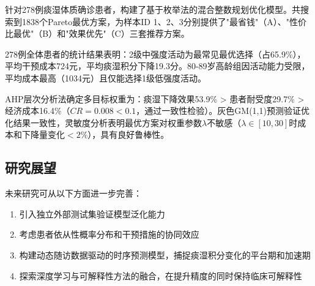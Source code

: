 \documentclass[12pt,a4paper]{ctexart}
\begin{document}
针对278例痰湿体质确诊患者，构建了基于枚举法的混合整数规划优化模型。共搜索到1838个Pareto最优方案，为样本ID 1、2、3分别提供了"最省钱"（A）、"性价比最优"（B）和"效果优先"（C）三套推荐方案。

278例全体患者的统计结果表明：2级中强度活动为最常见最优选择（占65.9\%），平均干预成本724元，平均痰湿积分下降19.3分。80-89岁高龄组因活动能力受限，平均成本最高（1034元）且仅能选择1级低强度活动。

AHP层次分析法确定多目标权重为：痰湿下降效果53.9\% > 患者耐受度29.7\% > 经济成本16.4\%（$CR=0.008<0.1$，通过一致性检验）。灰色GM(1,1)预测验证优化结果一致性，灵敏度分析表明最优方案对权重参数$\lambda$不敏感（$\lambda \in [10,30]$时成本和下降量变化$<2\%$），具有良好鲁棒性。

\subsection{研究展望}

未来研究可从以下方面进一步完善：
\begin{enumerate}
    \item 引入独立外部测试集验证模型泛化能力
    \item 考虑患者依从性概率分布和干预措施的协同效应
    \item 构建动态随访数据驱动的时序预测模型，捕捉痰湿积分变化的平台期和加速期
    \item 探索深度学习与可解释性方法的融合，在提升精度的同时保持临床可解释性
\end{enumerate}
\end{document}
